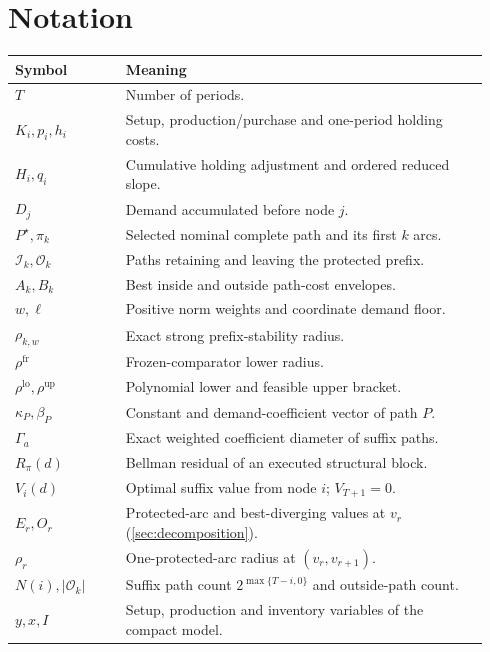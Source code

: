 \documentclass[11pt]{article}
\theoremstyle{definition}
\newcommand{\cI}{\mathcal{I}}
\newcommand{\cO}{\mathcal{O}}
\newcommand{\ellv}{\ell}
\newcommand{\rhofr}{\rho^{\mathrm{fr}}}
\newcommand{\rholo}{\rho^{\mathrm{lo}}}
\newcommand{\rhohi}{\rho^{\mathrm{up}}}
\begin{document}
\section{Notation}

\begin{longtable}{@{}p{0.22\linewidth}p{0.72\linewidth}@{}}
\toprule
Symbol & Meaning \\
\midrule
$T$ & Number of periods. \\
$K_i,p_i,h_i$ & Setup, production/purchase and one-period holding costs. \\
$H_i,q_i$ & Cumulative holding adjustment and ordered reduced slope. \\
$D_j$ & Demand accumulated before node $j$. \\
$P^\star,\pi_k$ & Selected nominal complete path and its first $k$ arcs. \\
$\cI_k,\cO_k$ & Paths retaining and leaving the protected prefix. \\
$A_k,B_k$ & Best inside and outside path-cost envelopes. \\
$w,\ellv$ & Positive norm weights and coordinate demand floor. \\
$\rho_{k,w}$ & Exact strong prefix-stability radius. \\
$\rhofr$ & Frozen-comparator lower radius. \\
$\rholo,\rhohi$ & Polynomial lower and feasible upper bracket. \\
$\kappa_P,\beta_P$ & Constant and demand-coefficient vector of path $P$. \\
$\Gamma_a$ & Exact weighted coefficient diameter of suffix paths. \\
$R_\pi(d)$ & Bellman residual of an executed structural block. \\
$V_i(d)$ & Optimal suffix value from node $i$; $V_{T+1}=0$. \\
$E_r,O_r$ & Protected-arc and best-diverging values at $v_r$ (\cref{sec:decomposition}). \\
$\rho_r$ & One-protected-arc radius at $(v_r,v_{r+1})$. \\
$N(i),\lvert\cO_k\rvert$ & Suffix path count $2^{\max\{T-i,0\}}$ and outside-path count. \\
$y,x,I$ & Setup, production and inventory variables of the compact model. \\
\bottomrule
\end{longtable}

\printbibliography
\end{document}
